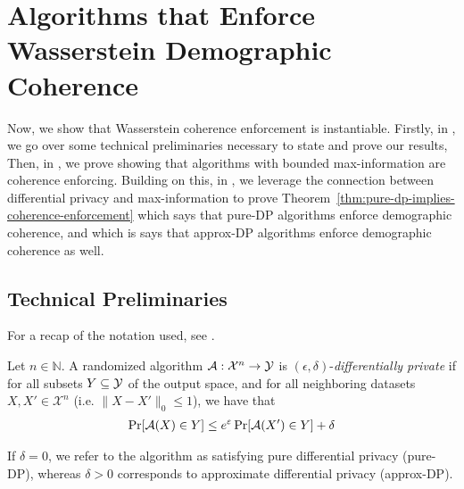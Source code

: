 \section{Algorithms that Enforce Wasserstein Demographic Coherence} \label{sec:acheivingdc}

Now, we show that Wasserstein coherence enforcement is instantiable. Firstly, in , we go over some technical preliminaries necessary to state and prove our results, Then, in , we prove  showing that algorithms with bounded max-information are coherence enforcing. Building on this, in , we leverage the connection between differential privacy and max-information to prove Theorem~\ref{thm:pure-dp-implies-coherence-enforcement} which says that pure-DP algorithms enforce demographic coherence, and  which is says that approx-DP algorithms enforce demographic coherence as well.

\subsection{Technical Preliminaries}\label{sec:techprelim}

For a recap of the notation used, see .

\begin{definition}
Let $n\in\mathbb{N}$. A randomized algorithm $\mathcal{A}:\mathcal{X}^n \to \mathcal{Y}$ is $(\epsilon, \delta)$-\emph{differentially private} if for all subsets $Y \subseteq \mathcal{Y}$ of the output space, and for all neighboring datasets $X, X' \in \mathcal{X}^n$ (i.e. $\|X - X' \|_0 \leq 1$), we have that
\begin{align*}
    \Pr[\mathcal{A}(X) \in Y] \leq e^{\varepsilon} \Pr[\mathcal{A}(X') \in Y] + \delta
\end{align*}
\end{definition}

If $\delta = 0$, we refer to the algorithm as satisfying pure differential privacy (pure-DP), whereas $\delta > 0$ corresponds to approximate differential privacy (approx-DP).


